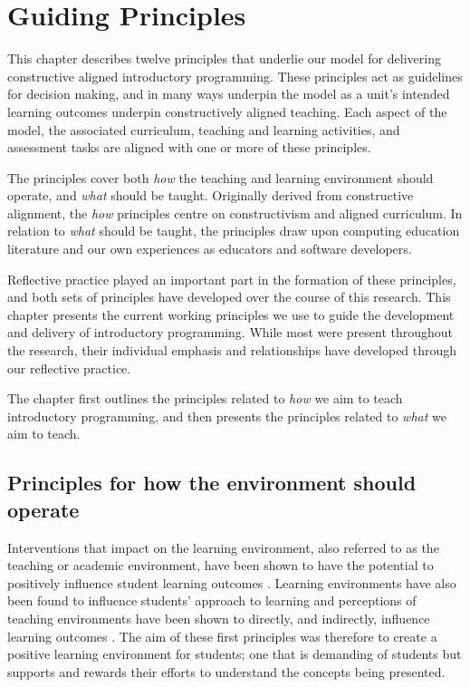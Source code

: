 
\chapter{Guiding Principles} %
\label{cha:guiding_principles}

\graphicspath{{Figures/CAApproach/}}

This chapter describes twelve principles that underlie our model for delivering constructive aligned introductory programming. These principles act as guidelines for decision making, and in many ways underpin the model as a unit's intended learning outcomes underpin constructively aligned teaching. Each aspect of the model, the associated curriculum, teaching and learning activities, and assessment tasks are aligned with one or more of these principles. 

The principles cover both \emph{how} the teaching and learning environment should operate, and \emph{what} should be taught. Originally derived from constructive alignment, the \emph{how} principles centre on constructivism and aligned curriculum. In relation to \emph{what} should be taught, the principles draw upon computing education literature and our own experiences as educators and software developers. 

Reflective practice played an important part in the formation of these principles, and both sets of principles have developed over the course of this research. This chapter presents the current working principles we use to guide the development and delivery of introductory programming. While most were present throughout the research, their individual emphasis and relationships have developed through our reflective practice. 

The chapter first outlines the principles related to \emph{how} we aim to teach introductory programming, and then presents the principles related to \emph{what} we aim to teach.



\section{Principles for how the environment should operate} %
\label{sub:principles_for_how_the_environment_should_operate}

 Interventions that impact on the learning environment, also referred to as the teaching or academic environment, have been shown to have the potential to positively influence student learning outcomes \cite{Trigwell:1991}. Learning environments have also been found to influence students' approach to learning \cite{Entwistle:1990,Entwistle:1991,Kember:2007} and perceptions of teaching environments have been shown to directly, and indirectly, influence learning outcomes \cite{Meyer:1990,Lizzio:2002}. The aim of these first principles was therefore to create a positive learning environment for students; one that is demanding of students but supports and rewards their efforts to understand the concepts being presented. 

